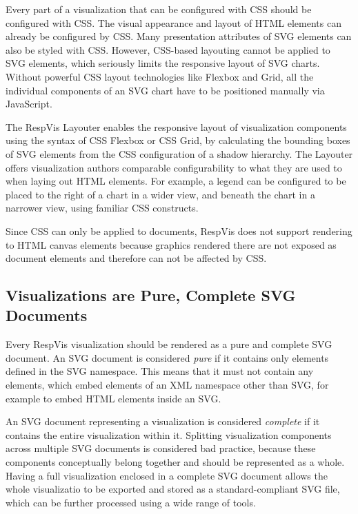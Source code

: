 
Every part of a visualization that can be configured with CSS should
be configured with CSS. The visual appearance and layout of HTML
elements can already be configured by CSS. Many presentation
attributes of SVG elements can also be styled with CSS. However,
CSS-based layouting cannot be applied to SVG elements, which seriously
limits the responsive layout of SVG charts. Without powerful CSS
layout technologies like Flexbox and Grid, all the individual
components of an SVG chart have to be positioned manually via
JavaScript.

The RespVis Layouter enables the responsive layout of visualization
components using the syntax of CSS Flexbox or CSS Grid, by calculating
the bounding boxes of SVG elements from the CSS configuration of a
shadow  hierarchy. The Layouter offers visualization
authors comparable configurability to what they are used to when
laying out HTML elements. For example, a legend can be configured to
be placed to the right of a chart in a wider view, and beneath the
chart in a narrower view, using familiar CSS constructs.

Since CSS can only be applied to documents,
RespVis does not support rendering to HTML canvas elements because
graphics rendered there are not exposed as document elements and
therefore can not be affected by CSS.




\subsection{Visualizations are Pure, Complete SVG Documents}

Every RespVis visualization should be rendered as a pure and complete
SVG document. An SVG document is considered \emph{pure} if it contains
only elements defined in the SVG namespace. This means that it must
not contain any  elements, which embed elements
of an XML namespace other than SVG, for example to embed HTML elements
inside an SVG.

An SVG document representing a visualization is considered
\emph{complete} if it contains the entire visualization within
it. Splitting visualization components across multiple SVG documents
is considered bad practice, because these components conceptually
belong together and should be represented as a whole. Having
a full visualization enclosed in a complete SVG document allows the
whole visualizatio to be exported and stored as a standard-compliant
SVG file, which can be further processed using a wide range of tools.



